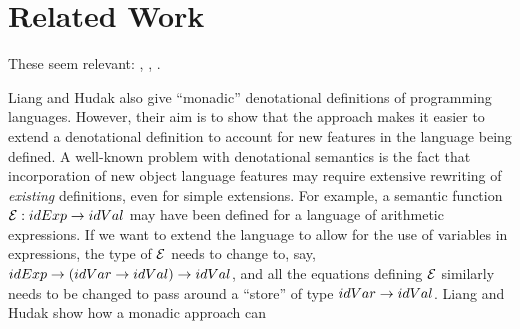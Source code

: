 \documentclass{CRPITStyle}
\begin{document}
\section{Related Work}

These seem relevant: 
,
,
.

Liang and Hudak also give ``monadic'' denotational definitions
of programming languages.
However, their aim is to show that the approach makes it easier
to extend a denotational definition to account for new features
in the language being defined.
A well-known problem with denotational semantics is
the fact that incorporation of new object language features may require
extensive rewriting of \emph{existing} definitions,
even for simple extensions.
For example, a semantic function 
${\cal E}: id{Exp} \rightarrow id{Val}$ 
may have been defined for a language of arithmetic expressions.
If we want to extend the language to allow for the use of variables
in expressions, the type of ${\cal E}$ needs to change to, say,
$id{Exp} \rightarrow (id{Var} \rightarrow id{Val}) \rightarrow id{Val}$,
and all the equations defining ${\cal E}$ similarly needs to be
changed to pass around a ``store'' of type $id{Var} \rightarrow id{Val}$.
Liang and Hudak show how a monadic approach can 






\end{document}
